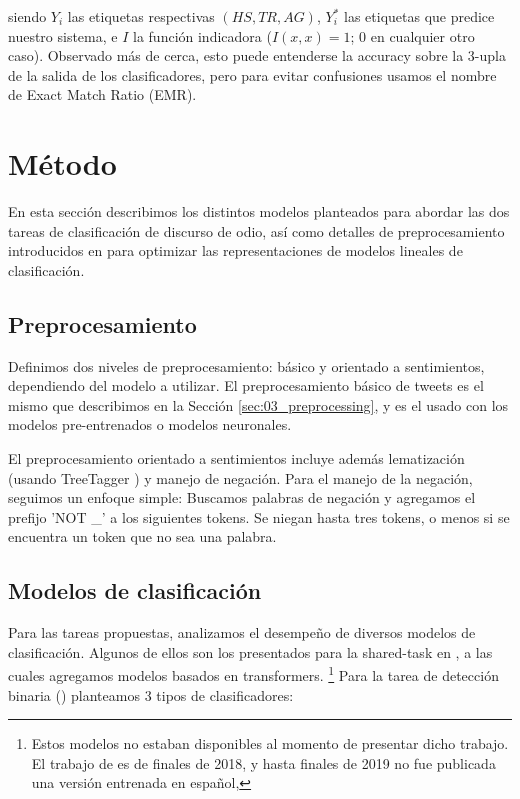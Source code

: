 \noindent siendo $Y_i$ las etiquetas respectivas $(HS, TR, AG)$, $Y_i^*$ las etiquetas que predice nuestro sistema, e  $I$ la función indicadora ($I(x, x) = 1$; $0$ en cualquier otro caso). Observado más de cerca, esto puede entenderse la accuracy sobre la 3-upla de la salida de los clasificadores, pero para evitar confusiones usamos el nombre de Exact Match Ratio (EMR). \cite{zhang-2014-multilabel}

\section{Método}

En esta sección describimos los distintos modelos planteados para abordar las dos tareas de clasificación de discurso de odio, así como detalles de preprocesamiento introducidos en \citet{perez-2019-atalaya} para optimizar las representaciones de modelos lineales de clasificación.

\subsection{Preprocesamiento}
\label{sec:04_preprocessing}

Definimos dos niveles de preprocesamiento: básico y orientado a sentimientos, dependiendo del modelo a utilizar. El preprocesamiento básico de tweets es el mismo que describimos en la Sección \ref{sec:03_preprocessing}, y es el usado con los modelos pre-entrenados o modelos neuronales.

El preprocesamiento orientado a sentimientos incluye además lematización (usando TreeTagger \cite{schmid95}) y manejo de negación. Para el manejo de la negación, seguimos un enfoque simple:
Buscamos palabras de negación y agregamos el prefijo 'NOT \_' a los siguientes tokens. Se niegan hasta tres tokens, o menos si se encuentra un token que no sea una palabra.

\subsection{Modelos de clasificación}
\label{sec:04_classifiers}

Para las tareas propuestas, analizamos el desempeño de diversos modelos de clasificación. Algunos de ellos son los presentados para la shared-task \hateval{} en \citet{perez-2019-atalaya}, a las cuales agregamos modelos basados en transformers. \footnote{Estos modelos no estaban disponibles al momento de presentar dicho trabajo. El trabajo de \bert{} \cite{devlin2018bert} es de finales de 2018, y hasta finales de 2019 no fue publicada una versión entrenada en español, \beto{}} Para la tarea de detección binaria (\subtaska{}) planteamos 3 tipos de clasificadores:

